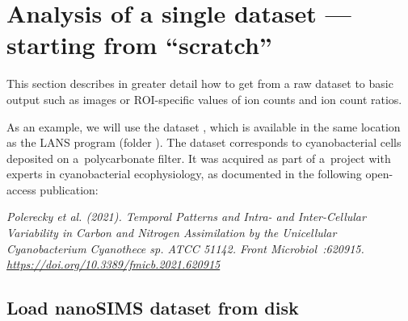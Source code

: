 \section{Analysis of a single dataset --- starting from ``scratch''}
\label{sec:level1}

\purplebox{}
This section describes in greater detail how to get from a raw dataset to basic output such as images or ROI-specific values of ion counts and ion count ratios. 
\tcbe

As an example, we will use the dataset , which is available in the same location as the LANS program (folder ). The dataset corresponds to cyanobacterial cells deposited on a~polycarbonate filter. It was acquired as part of a~project with experts in cyanobacterial ecophysiology, as documented in the following open-access publication:

\skybluebox{}
\vskip0.5mm
\begin{center}
\begin{minipage}{0.93\textwidth}
\textsl{\small Polerecky et al. (2021). Temporal Patterns and Intra- and Inter-Cellular Variability in Carbon and Nitrogen Assimilation by the Unicellular Cyanobacterium Cyanothece sp. ATCC 51142. \emph{Front Microbiol}~:620915. \url{https://doi.org/10.3389/fmicb.2021.620915}}
\end{minipage}
\end{center}
\tcbe

\vskip5mm


\subsection{Load nanoSIMS dataset from disk}
\setcounter{step}{0}

\vskip2.5mm


